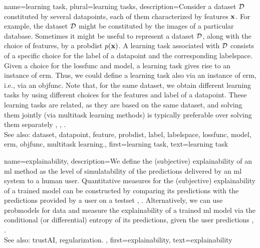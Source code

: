 {name={learning task}, plural={learning tasks}, 
	description={Consider a \gls{dataset} $\mathcal{D}$ constituted by several \glspl{datapoint}, each of them 
	 	characterized by \glspl{feature} ${\bf x}$. For example, the \gls{dataset} $\mathcal{D}$ 
	 	might be constituted by the images of a particular database. Sometimes it might be useful 
	 	to represent a \gls{dataset} $\mathcal{D}$, along with the choice of \glspl{feature}, by a \gls{probdist} $p({\bf x})$. 
	 	A learning task associated with $\mathcal{D}$ consists of a specific 
	 	choice for the \gls{label} of a \gls{datapoint} and the corresponding \gls{labelspace}. 
	 	Given a choice for the \gls{lossfunc} and \gls{model}, a learning task gives rise to an 
	 	instance of \gls{erm}. Thus, we could define a learning task also via an instance of \gls{erm}, i.e., 
	 	via an \gls{objfunc}. Note that, for the same \gls{dataset}, we obtain different learning tasks by using 
	 	different choices for the \glspl{feature} and \gls{label} of a \gls{datapoint}. These learning 
	 	tasks are related, as they are based on the same \gls{dataset}, and solving them jointly 
	 	(via \gls{multitask learning} methods) is typically preferable over solving them separately \cite{Caruana:1997wk}, \cite{JungGaphLassoSPL}, \cite{CSGraphSelJournal}.
	 			\\ 
		See also: \gls{dataset}, \gls{datapoint}, \gls{feature}, \gls{probdist}, \gls{label}, \gls{labelspace}, \gls{lossfunc}, \gls{model}, \gls{erm}, \gls{objfunc}, \gls{multitask learning}.},
	first={learning task},
	text={learning task}
}

{name={explainability},
	description={We define the (subjective) explainability of an \gls{ml} method 
		as the level of simulatability \cite{Colin:2022aa} of the \glspl{prediction} 
		delivered by an \gls{ml} system to a human user. Quantitative measures for the 
		(subjective) explainability of a trained \gls{model} can be constructed by 
		comparing its \glspl{prediction} with the \glspl{prediction} provided by a user 
		on a \gls{testset} \cite{Colin:2022aa}, \cite{Zhang:2024aa}. Alternatively, we can use 
		\glspl{probmodel} for \gls{data} and measure the explainability of a trained \gls{ml} 
		\gls{model} via the conditional (or differential) \gls{entropy} of its \glspl{prediction}, given the user \glspl{prediction} \cite{JunXML2020}, \cite{Chen2018}.
						\\ 
		See also: \gls{trustAI}, \gls{regularization}.
		},
		first={explainability},
		text={explainability}
	}


